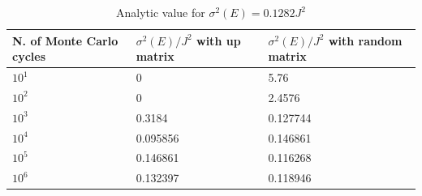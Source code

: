 \documentclass[10pt,a4paper,titlepage]{article}
\begin{document}
\begin{minipage}[b]{0.5\linewidth}\centering
\begin{table}[H]
\caption{{\footnotesize Analytic value for  $\sigma^{2}(E)  = 0.1282 J^2$}}
\begin{center}
\begin{tabular}[t]{|p{2.3cm}|p{2.3cm}|p{2.3cm}|}
\hline
N. of Monte Carlo cycles & $ \sigma^{2}(E)/J^2$  with up matrix & $ \sigma^{2}(E)/J^2$   with random matrix \\\hline
$10^{1}$ & 0 &5.76\\\hline
$10^{2}$& 0 &2.4576\\\hline
$10^{3}$ &  0.3184 &0.127744\\\hline
$10^{4}$ & 0.095856 &0.146861\\\hline
$10^{5}$& 0.146861 &0.116268\\\hline
$10^{6}$& 0.132397 &0.118946\\\hline
\end{tabular}
\end{center}
\end{table}
\end{minipage}
\end{document}
